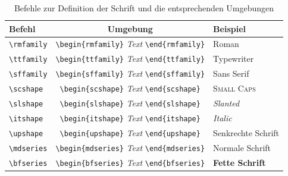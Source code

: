 \documentclass[a4paper,10pt,twoside]{scrbook}
\begin{document}
\begin{table}[h!tb]
\centering
\caption{Befehle zur Definition der Schrift und die entsprechenden Umgebungen}
\label{Tabelle_SchriftfamilieSchriftschnittOhneArgument}       %
\begin{tabular}{lcl}
\hline
Befehl & Umgebung & Beispiel \\
\hline
\texttt{\textbackslash rmfamily} & \texttt{\textbackslash begin\{rmfamily\}} \enskip \textsl{Text} \enskip \texttt{\textbackslash end\{rmfamily\}} & {\rmfamily Roman} \\
\texttt{\textbackslash ttfamily} & \texttt{\textbackslash begin\{ttfamily\}} \enskip \textsl{Text} \enskip \texttt{\textbackslash end\{ttfamily\}} & {\ttfamily Typewriter} \\
\texttt{\textbackslash sffamily} & \texttt{\textbackslash begin\{sffamily\}} \enskip \textsl{Text} \enskip \texttt{\textbackslash end\{sffamily\}} & {\sffamily Sans Serif} \\
\texttt{\textbackslash scshape} & \texttt{\textbackslash begin\{scshape\}} \enskip \textsl{Text} \enskip \texttt{\textbackslash end\{scshape\}} & {\scshape Small Caps} \\
\texttt{\textbackslash slshape} & \texttt{\textbackslash begin\{slshape\}} \enskip \textsl{Text} \enskip \texttt{\textbackslash end\{slshape\}} & {\slshape Slanted} \\
\texttt{\textbackslash itshape} & \texttt{\textbackslash begin\{itshape\}} \enskip \textsl{Text} \enskip \texttt{\textbackslash end\{itshape\}} & {\itshape Italic} \\
\texttt{\textbackslash upshape} & \texttt{\textbackslash begin\{upshape\}} \enskip \textsl{Text} \enskip \texttt{\textbackslash end\{upshape\}} & {\upshape Senkrechte Schrift} \\
\texttt{\textbackslash mdseries} & \texttt{\textbackslash begin\{mdseries\}} \enskip \textsl{Text} \enskip \texttt{\textbackslash end\{mdseries\}} & {\mdseries Normale Schrift} \\
\texttt{\textbackslash bfseries} & \texttt{\textbackslash begin\{bfseries\}} \enskip \textsl{Text} \enskip \texttt{\textbackslash end\{bfseries\}} & {\bfseries Fette Schrift} \\
\hline
\end{tabular}
\end{table}
\end{document}
